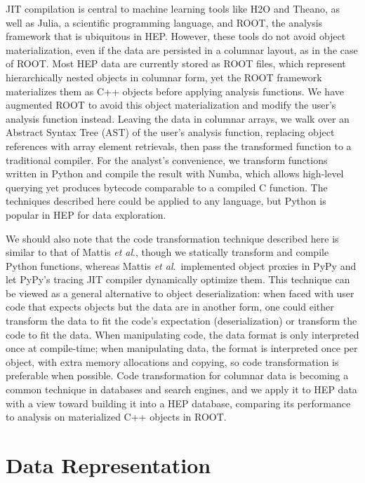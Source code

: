 \documentclass[10pt, conference, compsocconf]{IEEEtran}
\begin{document}
JIT compilation is central to machine learning tools like H2O\cite{h2o} and Theano\cite{theano}, as well as Julia\cite{julia}, a scientific programming language, and ROOT\cite{root}, the analysis framework that is ubiquitous in HEP. However, these tools do not avoid object materialization, even if the data are persisted in a columnar layout, as in the case of ROOT. Most HEP data are currently stored as ROOT files, which represent hierarchically nested objects in columnar form, yet the ROOT framework materializes them as C++ objects before applying analysis functions. We have augmented ROOT\cite{bulkio} to avoid this object materialization and modify the user's analysis function instead. Leaving the data in columnar arrays, we walk over an Abstract Syntax Tree (AST) of the user's analysis function, replacing object references with array element retrievals, then pass the transformed function to a traditional compiler. For the analyst's convenience, we transform functions written in Python and compile the result with Numba\cite{numba}, which allows high-level querying yet produces bytecode comparable to a compiled C function. The techniques described here could be applied to any language, but Python is popular in HEP for data exploration.

We should also note that the code transformation technique described here is similar to that of Mattis {\it et al}.\cite{columnarobjects}, though we statically transform and compile Python functions, whereas Mattis {\it et al}.\ implemented object proxies in PyPy and let PyPy's tracing JIT compiler dynamically optimize them. This technique can be viewed as a general alternative to object deserialization: when faced with user code that expects objects but the data are in another form, one could either transform the data to fit the code's expectation (deserialization) or transform the code to fit the data. When manipulating code, the data format is only interpreted once at compile-time; when manipulating data, the format is interpreted once per object, with extra memory allocations and copying, so code transformation is preferable when possible. Code transformation for columnar data is becoming a common technique in databases and search engines\cite{searchengine}, and we apply it to HEP data with a view toward building it into a HEP database, comparing its performance to analysis on materialized C++ objects in ROOT.

\section{Data Representation}
\end{document}
